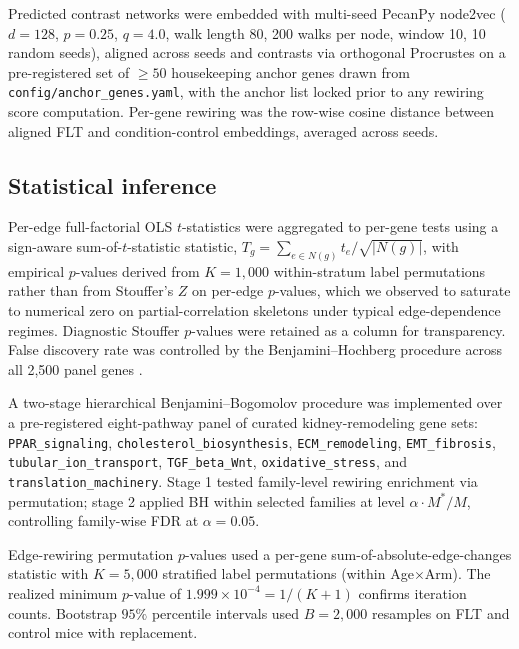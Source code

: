 \documentclass[11pt]{article}
\newcommand{\code}[1]{\texttt{#1}}
\newcommand{\pkg}[1]{\textsf{#1}}
\begin{document}
Predicted contrast networks were embedded with multi-seed \pkg{PecanPy} \pkg{node2vec} \citep{grover2016node2vec, liu2021pecanpy} ($d{=}128$, $p{=}0.25$, $q{=}4.0$, walk length 80, 200 walks per node, window 10, 10 random seeds), aligned across seeds and contrasts via orthogonal Procrustes \citep{schonemann1966generalized} on a pre-registered set of $\geq 50$ housekeeping anchor genes drawn from \code{config/anchor\_genes.yaml}, with the anchor list locked prior to any rewiring score computation. Per-gene rewiring was the row-wise cosine distance between aligned FLT and condition-control embeddings, averaged across seeds.

\subsection{Statistical inference}

Per-edge full-factorial OLS $t$-statistics were aggregated to per-gene tests using a sign-aware sum-of-$t$-statistic statistic, $T_g = \sum_{e\in N(g)} t_e / \sqrt{|N(g)|}$, with empirical $p$-values derived from $K{=}1{,}000$ within-stratum label permutations rather than from Stouffer's $Z$ on per-edge $p$-values, which we observed to saturate to numerical zero on partial-correlation skeletons under typical edge-dependence regimes. Diagnostic Stouffer $p$-values were retained as a column for transparency. False discovery rate was controlled by the Benjamini--Hochberg procedure across all 2{,}500 panel genes \citep{benjamini1995controlling}.

A two-stage hierarchical Benjamini--Bogomolov procedure \citep{benjamini2014selective} was implemented over a pre-registered eight-pathway panel of curated kidney-remodeling gene sets: \code{PPAR\_signaling}, \code{cholesterol\_biosynthesis}, \code{ECM\_remodeling}, \code{EMT\_fibrosis}, \code{tubular\_ion\_transport}, \code{TGF\_beta\_Wnt}, \code{oxidative\_stress}, and \code{translation\_machinery}. Stage 1 tested family-level rewiring enrichment via permutation; stage 2 applied BH within selected families at level $\alpha\cdot M^*/M$, controlling family-wise FDR at $\alpha{=}0.05$.

Edge-rewiring permutation $p$-values used a per-gene sum-of-absolute-edge-changes statistic with $K{=}5{,}000$ stratified label permutations (within Age$\times$Arm). The realized minimum $p$-value of $1.999\times 10^{-4} = 1/(K{+}1)$ confirms iteration counts. Bootstrap $95\%$ percentile intervals used $B{=}2{,}000$ resamples on FLT and control mice with replacement.
\end{document}
